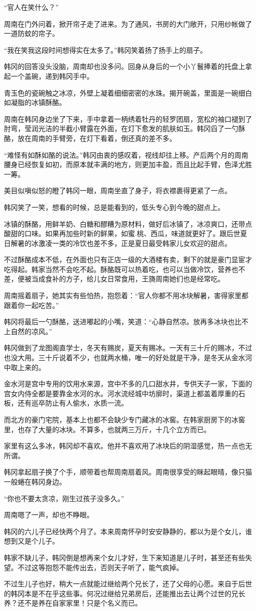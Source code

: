 “官人在笑什么？”

周南在门外问着，掀开帘子走了进来。为了通风，书房的大门敞开，只用纱帐做了一道防蚊的帘子。

“我在笑我这段时间想得实在太多了。”韩冈笑着扬了扬手上的扇子。

韩冈的回答没头没脑，周南却也没多问。回身从身后的一个小丫鬟捧着的托盘上拿起一个盖碗，递到韩冈手中。

青玉色的瓷碗触之冰凉，外壁上凝着细细密密的水珠。揭开碗盖，里面是一碗细白如凝脂的冰镇酥酪。

周南在韩冈身边坐了下来，手中拿着一柄绣着牡丹的轻罗团扇，宽松的袖口褪到了肘弯，莹润光洁的半截小臂露在外面，在灯下愈发的肌肤如玉。韩冈舀了一勺酥酪，放在周南的手臂旁，在灯下看着，倒还真的差不多。

“难怪有如酥如酪的说法。”韩冈由衷的感叹着，视线却往上移。产后两个月的周南腰身已经恢复如初，而原本就丰满的地方，则更加丰盈，而且比起手臂，色泽尤胜一筹。

美目似嗔似怒的瞪了韩冈一眼，周南坐直了身子，将衣襟裹得更紧了一点。

韩冈笑了一笑，想看的时候，总是能看到的，低头专心到今晚的甜点上。

冰镇的酥酪，用鲜羊奶、白糖和醪糟为原材料，做好后冰镇了，冰凉爽口，还带点酸甜的口味。如果再加些时新的鲜果，如蜜.桃、西瓜，味道就更好了。跟后世夏日解暑的冰激凌一类的冷饮也差不多，正是夏日最受韩家儿女欢迎的甜点。

不过酥酪成本不低，在外面也只有正店一级的大酒楼有卖，剩下的就是豪门显宦才吃得起。韩家当然不会吃不起。酥酪既可以热着吃，也可以当做冷饮，营养也不差，便被当成食补的方子，给儿女日常食用，王旖周南她们也是经常吃。

周南摇着扇子，她其实有些怕热，抱怨着：“官人你都不用冰块解暑，害得家里都跟着你一起吃苦。”

韩冈将最后一勺酥酪，送进嘟起的小嘴，笑道：“心静自然凉。放再多冰块也比不上自然的凉风。”

韩冈做到了龙图阁直学士，冬天有赐炭，夏天有赐冰。一天有三十斤的赐冰，不过也没大用。三十斤说着不少，也就两水桶，唯一的好处就是干净，是冬天从金水河中取上来的。

金水河是宫中专用的饮用水来源，宫中不多的几口甜水井，专供天子一家，下面的宫女内侍全都是要靠金水河的水。河水流经城中坊廓时，渠道上都盖着厚重的石板，还有巡卒防止有人偷水，水质一流。

而北方的豪门宅院，基本上也都不会缺少专门藏冰的冰窖。在韩家厨房下的冰窖里，也存了大量的冰块。不算多，也就两三万斤，十几个立方而已。

家里有这么多冰，韩冈却不喜欢。他并不喜欢用了冰块后的阴湿感觉，热一点也无所谓。

韩冈拿起扇子换了个手，顺带着也帮周南扇着风。周南很享受的眯起眼晴，像只猫一般蜷在韩冈身边。

“你也不要太贪凉，刚生过孩子没多久。”

周南嗯了一声，却也不睁眼。

韩冈的六儿子已经快两个月了。本来周南怀孕时安安静静的，都以为是个女儿，谁想到又是个儿子。

韩家不缺儿子，韩冈倒是想再来个女儿才好，生下来知道是儿子时，甚至还有些失望。不过这等抱怨不能传出去，否则天子听了，能气疯掉。

不过生儿子也好，稍大一点就能过继给两个兄长了，还了父母的心愿。来自于后世的韩冈本是不在乎这些事。何况过继给兄弟房后，还能推出去让两个过世的兄长养？还不是养在自家家里！只是个名义而已。

